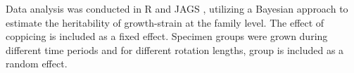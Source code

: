 Data analysis was conducted in R \citep{R} and JAGS \citep{RJAGS}, utilizing a Bayesian approach to estimate the heritability of growth-strain at the family level. The effect of coppicing is included as a fixed effect. Specimen groups were grown during different time periods and for different rotation lengths, group is included as a random effect. 